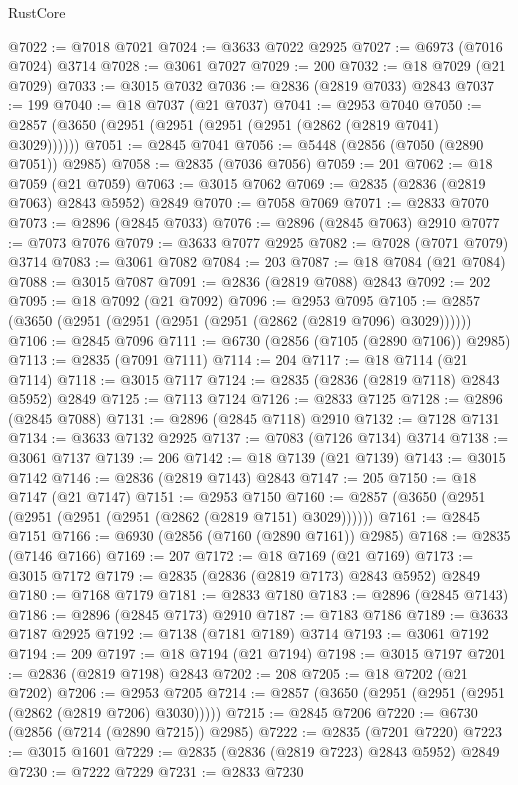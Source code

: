 \begin{lexlean}{RustCore}
\begin{coremodule}
@7022 := @7018 @7021
@7024 := @3633 @7022 @2925
@7027 := @6973 (@7016 @7024) @3714
@7028 := @3061 @7027
@7029 := 200
@7032 := @18 @7029 (@21 @7029)
@7033 := @3015 @7032
@7036 := @2836 (@2819 @7033) @2843
@7037 := 199
@7040 := @18 @7037 (@21 @7037)
@7041 := @2953 @7040
@7050 := @2857 (@3650 (@2951 (@2951 (@2951 (@2951 (@2862 (@2819 @7041) @3029))))))
@7051 := @2845 @7041
@7056 := @5448 (@2856 (@7050 (@2890 @7051)) @2985)
@7058 := @2835 (@7036 @7056)
@7059 := 201
@7062 := @18 @7059 (@21 @7059)
@7063 := @3015 @7062
@7069 := @2835 (@2836 (@2819 @7063) @2843 @5952) @2849
@7070 := @7058 @7069
@7071 := @2833 @7070
@7073 := @2896 (@2845 @7033)
@7076 := @2896 (@2845 @7063) @2910
@7077 := @7073 @7076
@7079 := @3633 @7077 @2925
@7082 := @7028 (@7071 @7079) @3714
@7083 := @3061 @7082
@7084 := 203
@7087 := @18 @7084 (@21 @7084)
@7088 := @3015 @7087
@7091 := @2836 (@2819 @7088) @2843
@7092 := 202
@7095 := @18 @7092 (@21 @7092)
@7096 := @2953 @7095
@7105 := @2857 (@3650 (@2951 (@2951 (@2951 (@2951 (@2862 (@2819 @7096) @3029))))))
@7106 := @2845 @7096
@7111 := @6730 (@2856 (@7105 (@2890 @7106)) @2985)
@7113 := @2835 (@7091 @7111)
@7114 := 204
@7117 := @18 @7114 (@21 @7114)
@7118 := @3015 @7117
@7124 := @2835 (@2836 (@2819 @7118) @2843 @5952) @2849
@7125 := @7113 @7124
@7126 := @2833 @7125
@7128 := @2896 (@2845 @7088)
@7131 := @2896 (@2845 @7118) @2910
@7132 := @7128 @7131
@7134 := @3633 @7132 @2925
@7137 := @7083 (@7126 @7134) @3714
@7138 := @3061 @7137
@7139 := 206
@7142 := @18 @7139 (@21 @7139)
@7143 := @3015 @7142
@7146 := @2836 (@2819 @7143) @2843
@7147 := 205
@7150 := @18 @7147 (@21 @7147)
@7151 := @2953 @7150
@7160 := @2857 (@3650 (@2951 (@2951 (@2951 (@2951 (@2862 (@2819 @7151) @3029))))))
@7161 := @2845 @7151
@7166 := @6930 (@2856 (@7160 (@2890 @7161)) @2985)
@7168 := @2835 (@7146 @7166)
@7169 := 207
@7172 := @18 @7169 (@21 @7169)
@7173 := @3015 @7172
@7179 := @2835 (@2836 (@2819 @7173) @2843 @5952) @2849
@7180 := @7168 @7179
@7181 := @2833 @7180
@7183 := @2896 (@2845 @7143)
@7186 := @2896 (@2845 @7173) @2910
@7187 := @7183 @7186
@7189 := @3633 @7187 @2925
@7192 := @7138 (@7181 @7189) @3714
@7193 := @3061 @7192
@7194 := 209
@7197 := @18 @7194 (@21 @7194)
@7198 := @3015 @7197
@7201 := @2836 (@2819 @7198) @2843
@7202 := 208
@7205 := @18 @7202 (@21 @7202)
@7206 := @2953 @7205
@7214 := @2857 (@3650 (@2951 (@2951 (@2951 (@2862 (@2819 @7206) @3030)))))
@7215 := @2845 @7206
@7220 := @6730 (@2856 (@7214 (@2890 @7215)) @2985)
@7222 := @2835 (@7201 @7220)
@7223 := @3015 @1601
@7229 := @2835 (@2836 (@2819 @7223) @2843 @5952) @2849
@7230 := @7222 @7229
@7231 := @2833 @7230

\end{coremodule}
\end{lexlean}
